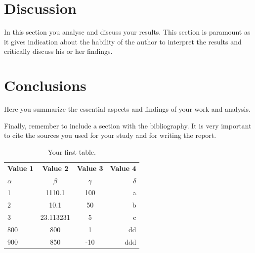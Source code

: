 \documentclass[letterpaper,12pt]{article}
\begin{document}
\section{Discussion}
In this section you analyse and discuss your results.
This section is paramount as it gives indication about the 
hability of the author to interpret the results and 
critically discuss his or her findings.

\section{Conclusions}
Here you summarize the essential aspects and findings 
of your work and analysis.

Finally, remember to include a section with the bibliography.
It is very important to cite the sources you used for your study and
for writing the report.



\begin{table}[h!]

\begin{center}

\begin{tabular}{l|c|c|r} %

\hline
\hline

\textbf{Value 1} & \textbf{Value 2} & \textbf{Value 3}  & \textbf{Value 4}\\

$\alpha$ & $\beta$ & $\gamma$ & $\delta$\\

\hline
\hline

1 & 1110.1 & 100 & a \\

2 & 10.1 & 50 & b \\

3 & 23.113231 & 5 & c \\

800 & 800 & 1 & dd \\

900 & 850 & -10 & ddd \\

\end{tabular}

\caption{Your first table.}

\label{tab:table1}

\end{center}

\end{table}
\end{document}
